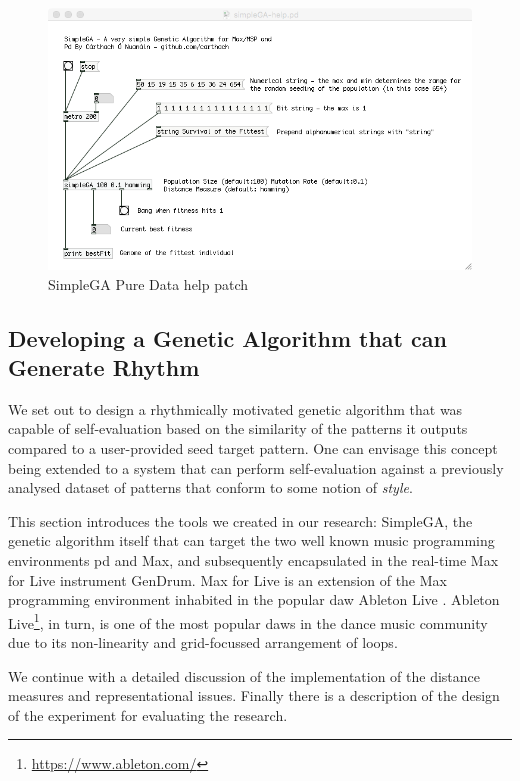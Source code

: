 \begin{figure}
	\begin{center}
		\includegraphics[width=\figSizeHundred]{ch03_symbolic/figures/simpleGA.png}
	\end{center}
	\caption[SimpleGA Pure Data help patch]{SimpleGA Pure Data help patch}
	\label{fig:simplega}
\end{figure}

\subsection{Developing a Genetic Algorithm that can Generate Rhythm}

We set out to design a rhythmically motivated genetic algorithm that was capable of self-evaluation based on the similarity of the patterns it outputs compared to a user-provided seed target pattern. One can envisage this concept being extended to a system that can perform self-evaluation against a previously analysed dataset of patterns that conform to some notion of \textit{style}. 

This section introduces the tools we created in our research: SimpleGA, the genetic algorithm itself that can target the two well known music programming environments \acrshort{pd} and Max, and subsequently encapsulated in the real-time Max for Live instrument GenDrum. Max for Live is an extension of the Max programming environment inhabited in the popular \acrshort{daw} Ableton Live \citep{Manzo2015}. Ableton Live\footnote{\url{https://www.ableton.com/}}, in turn, is one of the most popular \acrshort{daw}s in the dance music community due to its non-linearity and grid-focussed arrangement of loops. 

We continue with a detailed discussion of the implementation of the distance measures and representational issues. Finally there is a description of the design of the experiment for evaluating the research.

